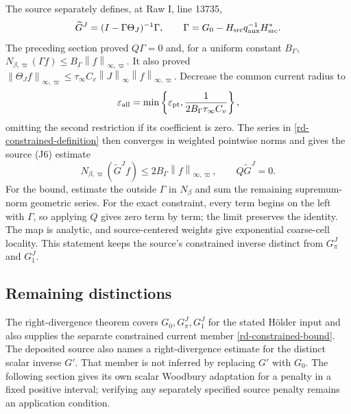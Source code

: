 \documentclass[11pt]{article}
\theoremstyle{remark}
\newcommand{\norm}[1]{\left\|#1\right\|}
\begin{document}
The source separately defines, at Raw I, line 13735,
\begin{equation}\label{rd-constrained-definition}
 \widetilde G^J=(I-\Gamma\Theta_J)^{-1}\Gamma,
 \qquad
 \Gamma=G_0-H_{\rm src}q_{\rm aux}^{-1}H_{\rm src}^*.
\end{equation}
The preceding section proved $Q\Gamma=0$ and, for a uniform
constant $B_\Gamma$,
$N_{\beta,\varpi}(\Gamma f)
 \le B_\Gamma\norm{f}_{\infty,\varpi}$.
It also proved
$\norm{\Theta_Jf}_{\infty,\varpi}
 \le\tau_\infty C_v\norm{J}_\infty
                      \norm{f}_{\infty,\varpi}$.
Decrease the common current radius to
\begin{equation}\label{rd-constrained-radius}
 \varepsilon_{\rm all}
  =\min\left\{\varepsilon_{\rm pt},
             \frac1{2B_\Gamma\tau_\infty C_v}\right\},
\end{equation}
omitting the second restriction if its coefficient is zero.
The series in \eqref{rd-constrained-definition} then converges in
weighted pointwise norms and gives the source (J6) estimate
\begin{equation}\label{rd-constrained-bound}
 N_{\beta,\varpi}(\widetilde G^Jf)
           \le2B_\Gamma\norm{f}_{\infty,\varpi},\qquad
                 Q\widetilde G^J=0.
\end{equation}
For the bound, estimate the outside $\Gamma$ in $N_\beta$ and
sum the remaining supremum-norm geometric series. For the exact
constraint, every term begins on the left with $\Gamma$, so applying
$Q$ gives zero term by term; the limit preserves the identity.
The map is analytic, and source-centered weights give exponential
coarse-cell locality. This statement keeps the source's constrained
inverse distinct from $G_\pi^J$ and $G_1^J$.

\subsection{Remaining distinctions}

The right-divergence theorem covers $G_0,G_\pi^J,G_1^J$ for the
stated H\"older input and also supplies the separate constrained
current member \eqref{rd-constrained-bound}. The deposited source
also names a right-divergence estimate for the distinct scalar
inverse $G'$. That member is not inferred by replacing $G'$ with
$G_0$. The following section gives its own scalar Woodbury adaptation
for a penalty in a fixed positive interval; verifying any separately
specified source penalty remains an application condition.
\end{document}

